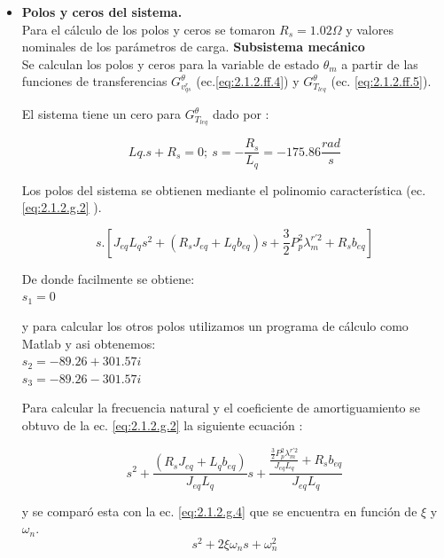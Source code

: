 \documentclass[10pt]{article}
\begin{document}
\begin{itemize} 
\item \textbf{Polos y ceros del sistema.}\\
Para el cálculo de los polos y ceros se tomaron $R_{s}=1.02 \Omega $ y valores nominales de los parámetros de carga.
\subitem \textbf{Subsistema mecánico}\\
Se calculan los polos y ceros para la variable de estado $\theta_{m}$ a partir de las funciones de transferencias $G^{\theta}_{v^{r}_{qs}}$ (ec.\ref{eq:2.1.2.ff.4}) y $G^{\theta}_{T_{leq}}$ (ec. \ref{eq:2.1.2.ff.5}).
 
El sistema tiene un cero para $G^{\theta}_{T_{leq}}$ dado por :

	\begin{equation}
	Lq . s + R_{s}=0; \ s=-\frac{R_{s}}{L_{q}} = -175.86 \frac{rad}{s}
	\label{eq:2.1.2.g.1}
	\end{equation}
	
Los polos del sistema se obtienen mediante el polinomio característica (ec. \ref{eq:2.1.2.g.2} ).

	\begin{equation}
	s.[J_{eq}L_{q}s^{2}+(R_{s}J_{eq}+L_{q}b_{eq})s + \frac{3}{2}P_{p}^{2}\lambda ^{r'2}_{m}+R_{s}b_{eq}]
	\label{eq:2.1.2.g.2}
	\end{equation}
	
De donde facilmente se obtiene:\\
$s_{1}=0$

y para calcular los otros polos utilizamos un programa de cálculo como Matlab y asi obtenemos:\\
$s_{2}=-89.26 + 301.57 i$\\
$s_{3}=-89.26 - 301.57 i$

Para calcular la frecuencia natural y el coeficiente de amortiguamiento se obtuvo de la ec. \ref{eq:2.1.2.g.2} la siguiente ecuación :

	\begin{equation}
	s^{2}+\frac{(R_{s}J_{eq}+L_{q}b_{eq})}{J_{eq}L_{q}}s +\frac{\frac{ \frac{3}{2}P_{p}^{2}\lambda ^{r'2}_{m}}{J_{eq}L_{q}}+R_{s}b_{eq}}{J_{eq}L_{q}}
	\label{eq:2.1.2.g.3}
	\end{equation}
	
y se comparó esta con la ec. \ref{eq:2.1.2.g.4} que se encuentra en función de $\xi$ y $\omega_{n}$.
	\begin{equation}
	s^{2}+2\xi \omega_{n} s + \omega_{n}^2 
	\label{eq:2.1.2.g.4}
	\end{equation}


\end{itemize}
\end{document}
